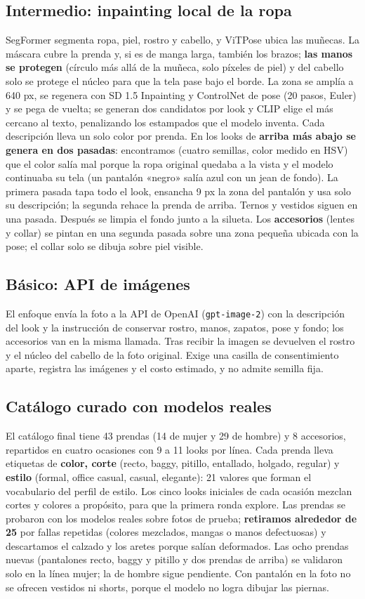 \documentclass[11pt,letterpaper]{article}
\begin{document}
\subsection{Intermedio: inpainting local de la ropa}
SegFormer segmenta ropa, piel, rostro y cabello, y ViTPose ubica las muñecas. La máscara cubre la prenda y, si es de
manga larga, también los brazos; \textbf{las manos se protegen} (círculo más allá de la muñeca, solo píxeles de piel) y del
cabello solo se protege el núcleo para que la tela pase bajo el borde. La zona se amplía a 640 px, se regenera con SD 1.5
Inpainting y ControlNet de pose (20 pasos, Euler) y se pega de vuelta; se generan dos candidatos por look y CLIP elige el
más cercano al texto, penalizando los estampados que el modelo inventa. Cada descripción lleva un solo color por
prenda. En los looks de \textbf{arriba más abajo se genera en dos pasadas}: encontramos (cuatro semillas, color medido en
HSV) que el color salía mal porque la ropa original quedaba a la vista y el modelo continuaba su tela (un pantalón
«negro» salía azul con un jean de fondo). La primera pasada tapa todo el look, ensancha 9 px la zona del pantalón y usa
solo su descripción; la segunda rehace la prenda de arriba. Ternos y vestidos siguen en una pasada. Después se limpia el
fondo junto a la silueta. Los \textbf{accesorios} (lentes y collar) se pintan en una segunda
pasada sobre una zona pequeña ubicada con la pose; el collar solo se dibuja sobre piel visible.

\subsection{Básico: API de imágenes}
El enfoque envía la foto a la API de OpenAI (\texttt{gpt-image-2}) con la descripción del look y la instrucción de
conservar rostro, manos, zapatos, pose y fondo; los accesorios van en la misma llamada. Tras recibir la imagen se
devuelven el rostro y el núcleo del cabello de la foto original. Exige una casilla de consentimiento aparte, registra
las imágenes y el costo estimado, y no admite semilla fija.

\subsection{Catálogo curado con modelos reales}
El catálogo final tiene 43 prendas (14 de mujer y 29 de hombre) y 8 accesorios, repartidos en cuatro ocasiones con 9 a
11 looks por línea. Cada prenda lleva etiquetas de \textbf{color, corte} (recto, baggy, pitillo, entallado, holgado,
regular) y \textbf{estilo} (formal, office casual, casual, elegante): 21 valores que forman el vocabulario del perfil de
estilo. Los cinco looks iniciales de cada ocasión mezclan cortes y colores a propósito, para que la primera ronda
explore. Las prendas se probaron con los modelos reales sobre fotos de prueba; \textbf{retiramos alrededor de 25} por
fallas repetidas (colores mezclados, mangas o manos defectuosas) y descartamos el calzado y los aretes porque salían
deformados. Las ocho prendas nuevas (pantalones recto, baggy y pitillo y dos prendas de arriba) se validaron solo en la
línea mujer; la de hombre sigue pendiente. Con pantalón en la foto no se ofrecen vestidos ni shorts, porque el modelo
no logra dibujar las piernas.
\end{document}
